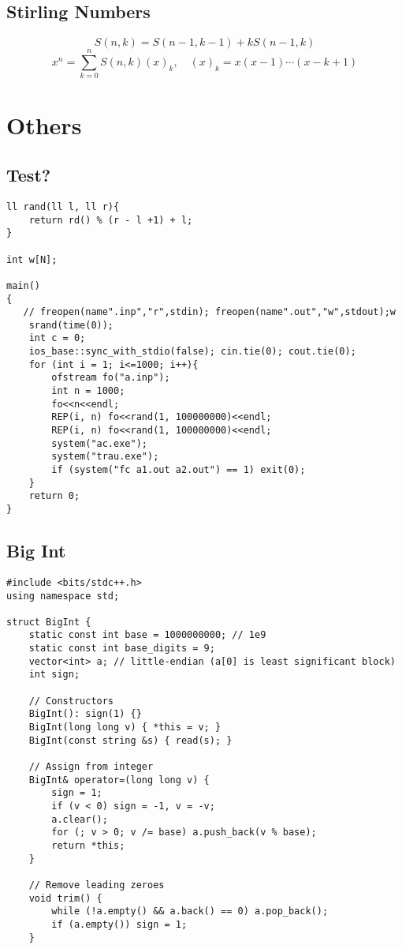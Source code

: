 \documentclass[11pt,a4paper]{article}
\begin{document}
\begin{multicols*}{2}
\subsection{Stirling Numbers}
\[
S(n,k) = S(n-1,k-1) + k S(n-1,k)
\]
\[
x^n = \sum_{k=0}^n S(n,k)(x)_k, \quad (x)_k = x(x-1)\cdots(x-k+1)
\]

\section{Others}
\subsection{Test?}
\begin{lstlisting}
ll rand(ll l, ll r){
    return rd() % (r - l +1) + l;
}

int w[N];

main()
{
   // freopen(name".inp","r",stdin); freopen(name".out","w",stdout);w
    srand(time(0));
    int c = 0;
    ios_base::sync_with_stdio(false); cin.tie(0); cout.tie(0);
    for (int i = 1; i<=1000; i++){
        ofstream fo("a.inp");
        int n = 1000;
        fo<<n<<endl;
        REP(i, n) fo<<rand(1, 100000000)<<endl;
        REP(i, n) fo<<rand(1, 100000000)<<endl;
        system("ac.exe");
        system("trau.exe");
        if (system("fc a1.out a2.out") == 1) exit(0);
    }
    return 0;
}

\end{lstlisting}

\subsection{Big Int}
\begin{lstlisting}
#include <bits/stdc++.h>
using namespace std;

struct BigInt {
    static const int base = 1000000000; // 1e9
    static const int base_digits = 9;
    vector<int> a; // little-endian (a[0] is least significant block)
    int sign;

    // Constructors
    BigInt(): sign(1) {}
    BigInt(long long v) { *this = v; }
    BigInt(const string &s) { read(s); }

    // Assign from integer
    BigInt& operator=(long long v) {
        sign = 1;
        if (v < 0) sign = -1, v = -v;
        a.clear();
        for (; v > 0; v /= base) a.push_back(v % base);
        return *this;
    }

    // Remove leading zeroes
    void trim() {
        while (!a.empty() && a.back() == 0) a.pop_back();
        if (a.empty()) sign = 1;
    }


\end{lstlisting}
\end{multicols*}
\end{document}
